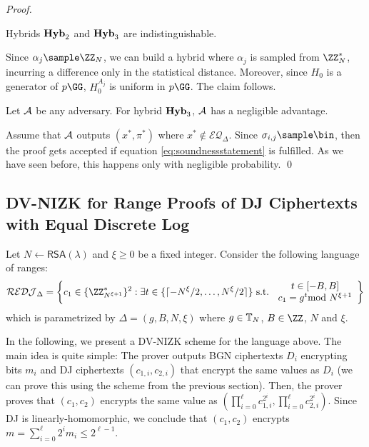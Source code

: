 \begin{proof}
\begin{claim}
Hybrids $\mathsf{\mathbf{Hyb}}_2$ and $\mathsf{\mathbf{Hyb}}_3$ are indistinguishable.
\end{claim}

Since $\alpha_j\sample \ZZ_N$, we can build a hybrid where $\alpha_j$ is sampled from $\ZZ_N^*$, incurring a difference only in the statistical distance. Moreover, since $H_0$ is a generator of $p\GG$, $H_0^{A_j}$ is uniform in $p\GG$. The claim follows.

 \begin{claim}
 \label{claim:neglsound}
 Let $\mathcal{A}$ be any adversary. For hybrid $\mathsf{\mathbf{Hyb}}_3$, $\mathcal{A}$ has a negligible advantage.
 \end{claim}

Assume that $\mathcal{A}$ outputs $(x^*,\pi^*)$ where $x^*\notin \mathcal{EQ}_\Delta$. Since $\sigma_{i,j}\sample \bin$, then the proof gets accepted if equation \ref{eq:soundnessstatement} is fulfilled. As we have seen before, this happens only with negligible probability.
\qed
\end{proof}



\subsection{DV-NIZK for Range Proofs of DJ Ciphertexts with Equal Discrete Log}

Let $N\leftarrow\mathsf{RSA}(\lambda)$ and $\xi\geq 0$ be a fixed integer. 
Consider the following language of ranges: 
$$\mathcal{REDJ}_{\Delta}=\left\{c_1\in \{\ZZ^\ast_{N^{\xi+1}}\}^2
:\exists t\in \{\lceil- N^\xi/2,\dots, N^\xi/2 \rceil\}%
\text{ s.t. }\begin{array}{c}
     t\in [-B,B] \\
     c_1=g^t \smod N^{\xi+1}\\ 
\end{array}\right \}$$ which is parametrized by $\Delta=(g,B,N,\xi) $ where $g\in \mathbb{T}_N$, $B\in\ZZ$,  $N$ and $\xi$.


In the following, we present a DV-NIZK scheme for the language above. The main idea is quite simple: The prover outputs BGN ciphertexts $D_i$ encrypting bits $m_i$ and DJ ciphertexts $(c_{1,i},c_{2,i})$ that encrypt the same values as $D_i$ (we can prove this using the scheme from the previous section). Then, the prover proves that $(c_1,c_2)$ encrypts the same value as $\left(\prod_{i=0}^\ell c_{1,i}^{2^i},\prod_{i=0}^\ell c_{2,i}^{2^i}\right)$. Since DJ is linearly-homomorphic, we conclude that $(c_1,c_2)$ encrypts $m=\sum_{i=0}^\ell 2^i m_i \leq 2^{\ell-1}$.

